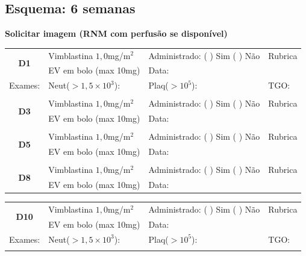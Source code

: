 \documentclass[11pt,a4paper,oldfontcommands]{memoir}
\begin{document}
\subsection{Esquema: 6 semanas}
\begin{center}
\textbf{Solicitar imagem (RNM com perfusão se disponível)}
\begin{table}[H]
\begin{tabular}{p{1.3cm}p{5cm}|p{5cm}|p{3cm}}
    \hline
    \multicolumn{1}{c|}{\multirow{2}{*}{\textbf{D1}}}&{Vimblastina \(1,0\)mg/m\(^2\)}&{Administrado: (  ) Sim (  ) Não}&{Rubrica}\\
    \multicolumn{1}{c|}{}&{EV em bolo (max 10mg)}&{Data:}&\\
    \hline
    {Exames:}&{Neut(\(>1,5\times10^3\)):}&{Plaq(\(>10^5\)):}&{TGO:}
    \\
    \hline
    \\
    \hline
    \multicolumn{1}{c|}{\multirow{2}{*}{\textbf{D3}}}&{Vimblastina \(1,0\)mg/m\(^2\)}&{Administrado: (  ) Sim (  ) Não}&{Rubrica}\\
    \multicolumn{1}{c|}{}&{EV em bolo (max 10mg)}&{Data:}&\\
    \hline
    \\
    \hline
    \multicolumn{1}{c|}{\multirow{2}{*}{\textbf{D5}}}&{Vimblastina \(1,0\)mg/m\(^2\)}&{Administrado: (  ) Sim (  ) Não}&{Rubrica}\\
    \multicolumn{1}{c|}{}&{EV em bolo (max 10mg)}&{Data:}&\\
    \hline
    \\
    \hline
    \multicolumn{1}{c|}{\multirow{2}{*}{\textbf{D8}}}&{Vimblastina \(1,0\)mg/m\(^2\)}&{Administrado: (  ) Sim (  ) Não}&{Rubrica}\\
    \multicolumn{1}{c|}{}&{EV em bolo (max 10mg)}&{Data:}&\\
    \hline
\end{tabular}
\end{table}
\begin{table}[H]
\begin{tabular}{p{1.3cm}p{5cm}|p{5cm}|p{3cm}}
    \hline
    \multicolumn{1}{c|}{\multirow{2}{*}{\textbf{D10}}}&{Vimblastina \(1,0\)mg/m\(^2\)}&{Administrado: (  ) Sim (  ) Não}&{Rubrica}\\
    \multicolumn{1}{c|}{}&{EV em bolo (max 10mg)}&{Data:}&\\
    \hline
    {Exames:}&{Neut(\(>1,5\times10^3\)):}&{Plaq(\(>10^5\)):}&{TGO:}
    \\
    \hline\\

\end{tabular}
\end{table}
\end{center}
\end{document}
